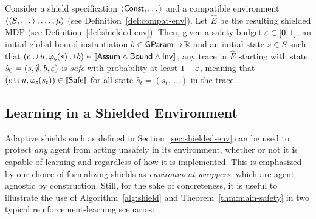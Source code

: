 \documentclass[acmsmall,screen,nonacm]{acmart}
\begin{document}
\begin{theorem}\label{thm:main-safety}
  Consider a shield specification $\left\langle\mathsf{Const}, \dots\right\rangle$ and a compatible environment $\left\langle\left\langle S, \dots\right\rangle, \dots, \mu\right\rangle$ (see Definition~\ref{def:compat-env}). Let $\hat E$ be the resulting shielded MDP (see Definition~\ref{def:shielded-env}). Then, given a safety budget $\varepsilon \in [0, 1]$, an initial global bound instantiation $b \in \mathsf{GParam} \mathrel{\!\to\!} \mathbb{R}$ and an initial state $s \in S$ such that $(c \CatValuation u, \StateMapping(s) \CatValuation b) \in \sem{\Assum \land \Bound \land \Inv}$, any trace in $\hat E$ starting with state $\hat s_0 = (s, \emptyset, b, \varepsilon)$ is \emph{safe} with probability at least $1 - \varepsilon$, meaning that $(c \CatValuation u, \StateMapping(s_t)) \in \sem{\Safe}$ for all state $\hat s_t = (s_t, \,\dots)$ in the trace.
\end{theorem}

\subsection{Learning in a Shielded Environment}\label{sec:learning-in-shielded-env}

Adaptive shields such as defined in Section~\ref{sec:shielded-env} can be used to protect \emph{any} agent from acting unsafely in its environment, whether or not it is capable of learning and regardless of how it is implemented. This is emphasized by our choice of formalizing shields as \emph{environment wrappers}, which are agent-agnostic by construction. Still, for the sake of concreteness, it is useful to illustrate the use of Algorithm~\ref{alg:shield} and Theorem~\ref{thm:main-safety} in two typical reinforcement-learning scenarios:
\end{document}
